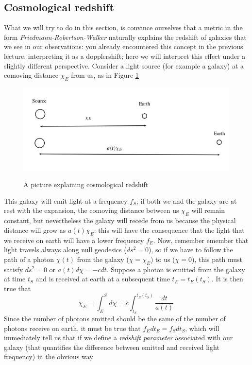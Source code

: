 \documentclass[11pt, a4paper,oneside,openright]{book}
\numberwithin{equation}{section}
\begin{document}
\subsection{Cosmological redshift}
What we will try to do in this section, is convince ourselves that a metric in the form \textit{Friedmann-Robertson-Walker} naturally explains the redshift of galaxies that we see in our observations: you already encountered this concept in the previous lecture, interpreting it as a dopplershift; here we will interpret this effect under a slightly different perspective. Consider a light source (for example a galaxy) at a comoving distance $\chi_E$ from us, as in Figure \ref{redshift}
\begin{figure}
\begin{center}
\includegraphics[scale=0.8]{Draw/redshift.png}
\label{}
\end{center}
\caption{A picture explaining cosmological redshift}
\label{redshift}
\end{figure}
This galaxy will emit light at a frequency $f_S$; if both we and the galaxy are at rest with the expansion, the comoving distance between us $\chi_E$ will remain constant, but nevertheless the galaxy will recede from us because the physical distance will grow as $a(t)\chi_E$: this will have the consequence that the light that we receive on earth will have a lower frequency $f_E$.  Now, remember emember that light travels always along null geodesics ($ds^2=0$), so if we have to follow the path of a photon $\chi(t)$ from the galaxy ($\chi=\chi_E$) to us ($\chi=0$), this path must satisfy $ds^2=0$ or $a(t)d\chi=-cdt$. Suppose a photon is emitted from the galaxy at time $t_S$ and is received at earth at a subsequent time $t_E=t_E(t_S)$. It is then true that 
\begin{equation}
\label{comdis}
\chi_E=\int_E^Sd\chi=c\int_{t_S}^{t_E(t_S)}\frac{dt}{a(t)}
\end{equation}
Since the number of photons emitted should be the same of the number of photons receive on earth, it must be true that $f_Edt_E=f_Sdt_S$, which will immediately tell us that if we define a \textit{redshift parameter} associated with our galaxy (that quantifies the difference between emitted and received light frequency) in the obvious way
\end{document}
